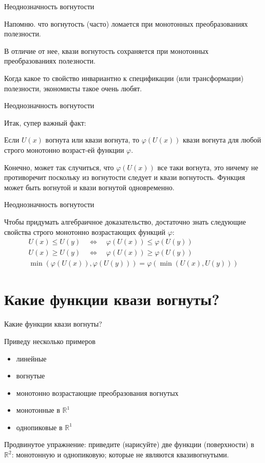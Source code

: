 \documentclass{beamer}
\begin{document}
\begin{frame}{Неоднозначность вогнутости}

Напомню. что \alert{вогнутость} (часто) \alert{ломается при монотонных преобразованиях} полезности. 

В отличие от нее, \alert{квази вогнутость сохраняется при монотонных преобразованиях} полезности. 

Когда какое то свойство инвариантно к спецификации (или трансформации) полезности, экономисты такое очень любят.
\end{frame}

\begin{frame}{Неоднозначность вогнутости}

Итак, супер важный факт:

\begin{lemma}
Если $U(x)$ вогнута или квази вогнута, то $\varphi(U(x))$ квази вогнута для любой строго монотонно возраст-ей функции $\varphi$. 
\end{lemma}

Конечно, может так случиться, что $\varphi(U(x))$ все таки вогнута, это ничему не противоречит поскольку из вогнутости следует и квази вогнутость. Функция может быть вогнутой и квази вогнутой одновременно.
\end{frame}

\begin{frame}{Неоднозначность вогнутости}

Чтобы придумать алгебраичное доказательство, достаточно знать следующие свойства строго монотонно возрастающих функций $\varphi$:
 \begin{align*}
U(x) \leqslant U(y) \quad \Leftrightarrow \quad \varphi(U(x)) \leqslant \varphi(U(y))\\
U(x) \geqslant U(y) \quad \Leftrightarrow \quad \varphi(U(x)) \geqslant \varphi(U(y))\\
\min(\varphi(U(x)), \varphi(U(y))) = \varphi(\min(U(x),U(y)))
\end{align*}

\end{frame}

\section{Какие функции квази вогнуты?}

\begin{frame}{Какие функции квази вогнуты?}

Приведу несколько примеров

\begin{itemize}
  \item линейные
  \item вогнутые
  \item монотонно возрастающие преобразования вогнутых
  \item монотонные в $\mathbb{R}^1$
  \item однопиковые в $\mathbb{R}^1$
\end{itemize}

Продвинутое упражнение: приведите (нарисуйте) две функции (поверхности) в $\mathbb{R}^2$: монотонную и однопиковую; которые не являются квазивогнутыми.
\end{frame}
\end{document}
